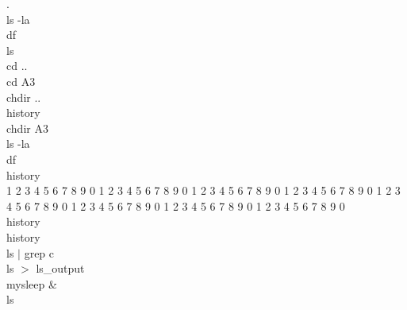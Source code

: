\documentclass[letter,10pt]{article}
\begin{document}
.
\\ls -la\\
df\\
ls\\
cd ..\\
cd A3\\
chdir ..\\
history\\
chdir A3\\
ls -la\\
df\\
history\\
1 2 3 4 5 6 7 8 9 0 1 2 3 4 5 6 7 8 9 0 1 2 3 4 5 6 7 8 9 0 1 2 3 4 5 6 7 8 9 0 1 2 3 4 5 6 7 8 9 0 1 2 3 4 5 6 7 8 9 0 1 2 3 4 5 6 7 8 9 0 1 2 3 4 5 6 7 8 9 0 \\
history\\
history\\
ls $|$ grep c\\
ls $>$ ls\_output\\
mysleep \& \\ 
ls \\
\end{document}
